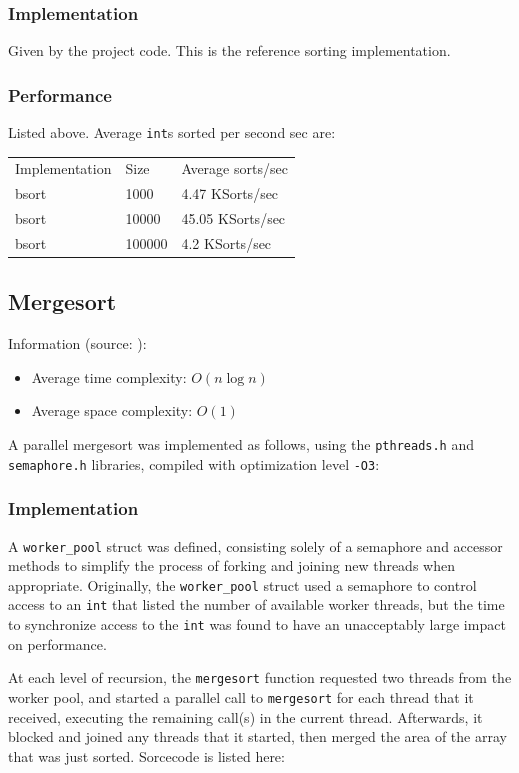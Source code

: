 \documentclass{article}
\begin{document}
\subsubsection{Implementation}
Given by the project code. This is the reference sorting implementation.
\subsubsection{Performance}
Listed above. Average \texttt{int}s sorted per second sec are: 
\begin{center}
\begin{tabular}{lll}
 Implementation   & Size &  Average sorts/sec  \\
 bsort           &  1000   &  4.47 KSorts/sec \\
 bsort           &  10000   &  45.05 KSorts/sec \\
 bsort           &  100000    &  4.2 KSorts/sec\\
\end{tabular}
\end{center}

\subsection{Mergesort}
Information (source: \cite{Algos}):
\begin{itemize}
\item Average time complexity: $O(n\log n)$
\item Average space complexity: $O(1)$ 
\end{itemize}

A parallel mergesort was implemented as follows, using the
\texttt{pthreads.h} and \texttt{semaphore.h} libraries, compiled with
optimization level \texttt{-O3}:

\subsubsection{Implementation}
A \texttt{worker\_pool} struct was defined, consisting solely of a
semaphore and accessor methods to simplify the process of forking and
joining new threads when appropriate. Originally, the
\texttt{worker\_pool} struct used a semaphore to control access to an
\texttt{int} that listed the number of available worker threads, but
the time to synchronize access to the \texttt{int} was found to have
an unacceptably large impact on performance. 

At each level of recursion, the \texttt{mergesort} function requested
two threads from the worker pool, and started a parallel call to
\texttt{mergesort} for each thread that it received, executing the
remaining call(s) in the current thread. Afterwards, it blocked and
joined any threads that it started, then merged the area of the array
that was just sorted. Sorcecode is listed here:
\end{document}
